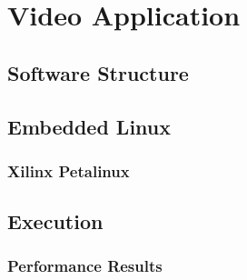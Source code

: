 

\chapter{Video Application}

\section{Software Structure}

\section{Embedded Linux}

\subsection{Xilinx Petalinux}

\section{Execution}

\subsection{Performance Results}